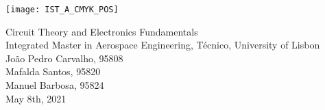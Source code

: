 
\thispagestyle {empty}

\texttt{[image: IST\_A\_CMYK\_POS]}

\begin{center}
%
\vspace{1.0cm}

\vspace{1cm}
{\FontLb Circuit Theory and Electronics Fundamentals} \\ %
\vspace{1cm}
{\FontSn Integrated Master in Aerospace Engineering, Técnico, University of Lisbon} \\ %
\vspace{1cm}
{\FontSn João Pedro Carvalho, 95808} \\
\vspace{0.3cm}
{\FontSn Mafalda Santos, 95820} \\
\vspace{0.3cm}
{\FontSn Manuel Barbosa, 95824} \\
\vspace{1cm}
{\FontSn May 8th, 2021} \\ %
%
\end{center}



